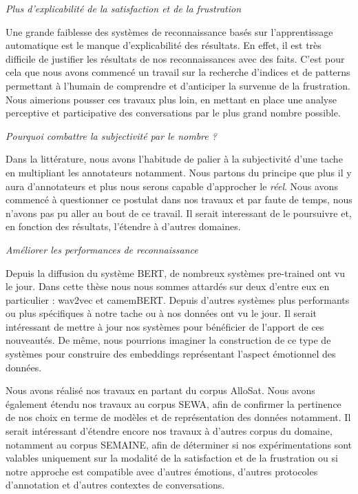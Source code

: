 \vspace{1cm}

\textit{Plus d'explicabilité de la satisfaction et de la frustration}

Une grande faiblesse des systèmes de reconnaissance basés sur l'apprentissage automatique est le manque d'explicabilité des résultats. En effet, il est très difficile de justifier les résultats de nos reconnaissances avec des faits. C'est pour cela que nous avons commencé un travail sur la recherche d'indices et de patterns permettant à l'humain de comprendre et d'anticiper la survenue de la frustration. Nous aimerions pousser ces travaux plus loin, en mettant en place une analyse perceptive et participative des conversations par le plus grand nombre possible.

\vspace{1cm}

\textit{Pourquoi combattre la subjectivité par le nombre ?}

Dans la littérature, nous avons l'habitude de palier à la subjectivité d'une tache en multipliant les annotateurs notamment. Nous partons du principe que plus il y aura d'annotateurs et plus nous serons capable d'approcher le \textit{réel}. Nous avons commencé à questionner ce postulat dans nos travaux et par faute de temps, nous n'avons pas pu aller au bout de ce travail. Il serait interessant de le poursuivre et, en fonction des résultats, l'étendre à d'autres domaines.

\vspace{1cm}

\textit{Améliorer les performances de reconnaissance}

Depuis la diffusion du système BERT, de nombreux systèmes pre-trained ont vu le jour. Dans cette thèse nous nous sommes attardés sur deux d'entre eux en particulier : wav2vec et camemBERT. Depuis d'autres systèmes plus performants ou plus spécifiques à notre tache ou à nos données ont vu le jour. Il serait intéressant de mettre à jour nos systèmes pour bénéficier de l'apport de ces nouveautés.
De même, nous pourrions imaginer la construction de ce type de systèmes pour construire des embeddings représentant l'aspect émotionnel des données.

Nous avons réalisé nos travaux en partant du corpus AlloSat. Nous avons également étendu nos travaux au corpus SEWA, afin de confirmer la pertinence de nos choix en terme de modèles et de représentation des données notamment. Il serait intéressant d'étendre encore nos travaux à d'autres corpus du domaine, notamment au corpus SEMAINE, afin de déterminer si nos expérimentations sont valables uniquement sur la modalité de la satisfaction et de la frustration ou si notre approche est compatible avec d'autres émotions, d'autres protocoles d'annotation et d'autres contextes de conversations.

